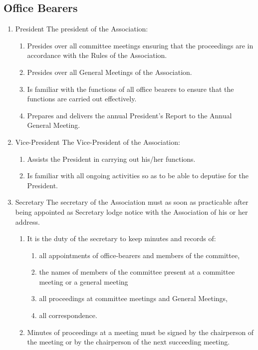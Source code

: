\documentclass{article}
\begin{document}
\subsection{Office Bearers}
\begin{enumerate}
  \item President
    The president of the Association:
    \begin{enumerate}
      \item Presides over all committee meetings ensuring that the proceedings are in accordance with the Rules of the Association.
      \item Presides over all General Meetings of the Association.
      \item Is familiar with the functions of all office bearers to ensure that the functions are carried out effectively.
      \item Prepares and delivers the annual President’s Report to the Annual General Meeting.
    \end{enumerate}
  \item Vice-President
    The Vice-President of the Association:
    \begin{enumerate}
      \item Assists the President in carrying out his/her functions.
      \item Is familiar with all ongoing activities so as to be able to deputise for the President.
    \end{enumerate}
  \item Secretary
    The secretary of the Association must as soon as practicable after being appointed as
    Secretary lodge notice with the Association of his or her address.
    \begin{enumerate}
      \item It is the duty of the secretary to keep minutes and records of:
        \begin{enumerate}
          \item all appointments of office-bearers and members of the committee,
          \item the names of members of the committee present at a committee meeting or a general meeting
          \item all proceedings at committee meetings and General Meetings,
          \item all correspondence.
        \end{enumerate}
      \item Minutes of proceedings at a meeting must be signed by the chairperson of the meeting or by the chairperson of the next succeeding meeting.

\end{enumerate}
\end{enumerate}
\end{document}
